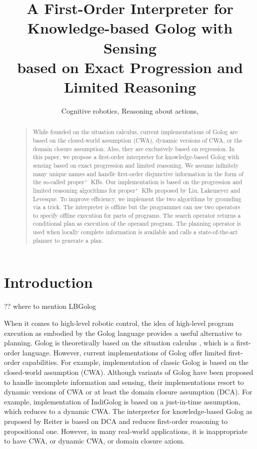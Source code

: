 \documentclass[letterpaper]{article}
\newcommand{\properplus}{\mbox{proper$^+$}}
\begin{document}
%
\title{A First-Order Interpreter for Knowledge-based Golog with Sensing\\ based on Exact Progression and Limited Reasoning}
\author{Cognitive robotics, Reasoning about actions, 
}
\maketitle
\begin{abstract}
\begin{quote}
While founded on the situation calculus, current implementations of Golog are based on the closed-world assumption (CWA), dynamic versions of CWA, or the domain closure assumption. Also, they are exclusively based on regression. In this paper, we propose a first-order interpreter for knowledge-based Golog with sensing based on exact progression and limited reasoning. We assume infinitely many unique names and handle first-order disjunctive information in the form of the so-called \properplus\ KBs. Our implementation is based on the progression and limited reasoning algorithms for \properplus\ KBs proposed by Liu, Lakemeyer and Levesque. To improve efficiency, we implement the two algorithms by grounding via a trick.
The interpreter is offline but the programmer can use two operators to specify offline execution for parts of programs. The search operator returns a conditional plan as execution of the operand program. The planning operator is used when locally complete information is available and calls a state-of-the-art planner to generate a plan.

\end{quote}
\end{abstract}

\section{Introduction}

?? where to mention LBGolog

When it comes to high-level robotic control, the idea of high-level program execution as embodied by the
Golog language \cite{Golog} provides a useful alternative to planning. Golog is theoretically based on the situation calculus \cite{Rei01}, which is a first-order language. However, current implementations of Golog offer limited first-order capabilities. For example, implementation of classic Golog is based on the closed-world assumption (CWA). Although variants of Golog have been proposed to handle incomplete information and sensing, their implementations resort to dynamic versions of CWA or at least the domain closure assumption (DCA). For example, implementation of IndiGolog \cite{GLS01} is based on a just-in-time assumption, which reduces to a dynamic CWA. The interpreter for knowledge-based Golog as proposed by Reiter  is based on DCA and reduces first-order reasoning to propositional one. However, in many real-world applications, it is inappropriate to have CWA, or dynamic CWA, or domain closure axiom.
\end{document}
